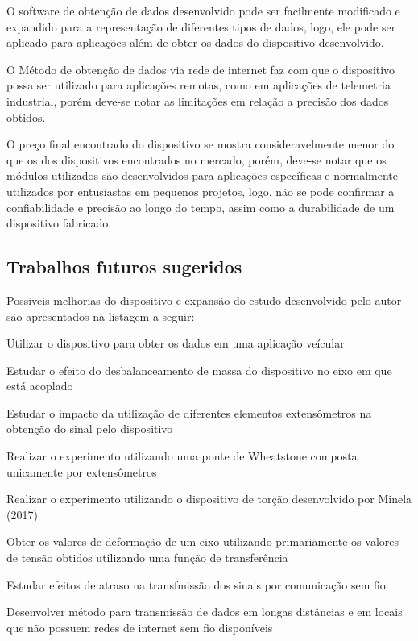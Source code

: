 O software de obtenção de dados desenvolvido pode ser facilmente modificado e expandido para a representação de diferentes tipos de dados, logo, ele pode ser aplicado para aplicações
além de obter os dados do dispositivo desenvolvido.

O Método de obtenção de dados via rede de internet faz com que o dispositivo possa ser utilizado para aplicações remotas, como em aplicações de telemetria industrial, porém
deve-se notar as limitações em relação a precisão dos dados obtidos.

O preço final encontrado do dispositivo se mostra consideravelmente menor do que os dos dispositivos encontrados no mercado, porém, deve-se notar que os módulos utilizados são
desenvolvidos para aplicações específicas e normalmente utilizados por entusiastas em pequenos projetos, logo, não se pode confirmar a confiabilidade e precisão ao longo do tempo,
assim como a durabilidade de um dispositivo fabricado.

\subsection{Trabalhos futuros sugeridos}

Possiveis melhorias do dispositivo e expansão do estudo desenvolvido pelo autor são apresentados na listagem a seguir:

\begin{alineas}
    \item{Utilizar o dispositivo para obter os dados em uma aplicação veícular}
    \item{Estudar o efeito do desbalanceamento de massa do dispositivo no eixo em que está acoplado}
    \item{Estudar o impacto da utilização de diferentes elementos extensômetros na obtenção do sinal pelo dispositivo}
    \item{Realizar o experimento utilizando uma ponte de Wheatstone composta unicamente por extensômetros}
    \item{Realizar o experimento utilizando o dispositivo de torção desenvolvido por Minela (2017)}
    \item{Obter os valores de deformação de um eixo utilizando primariamente os valores de tensão obtidos utilizando uma função de transferência}
    \item{Estudar efeitos de atraso na transfmissão dos sinais por comunicação sem fio}
    \item{Desenvolver método para transmissão de dados em longas distâncias e em locais que não possuem redes de internet sem fio disponíveis}
\end{alineas}
